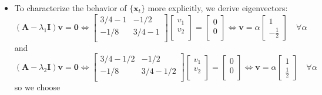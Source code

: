 \documentclass[12pt,a4paper]{article}
\begin{document}
\begin{itemize}
\begin{itemize}
  \item To characterize the behavior of $\{\bm{x}_{t}\}$ more explicitly,
    we derive eigenvectors:
    \begin{equation}\nonumber%
      (\bm{A}-\lambda_{1}\bm{I})\bm{v}
      = \bm{0}
      \iff
      \begin{bmatrix}
        3/4 - 1 & - 1/2 \\
        -1/8 & 3/4 - 1 \\
      \end{bmatrix}
      \begin{bmatrix}
        v_{1} \\
        v_{2} \\
      \end{bmatrix}
      =
      \begin{bmatrix}
        0 \\
        0 \\
      \end{bmatrix}
      \iff
      \bm{v} = \alpha
      \begin{bmatrix}
        1 \\
        -\frac{1}{2}
      \end{bmatrix}
      \quad \forall \alpha
    \end{equation}
    and
    \begin{equation}\nonumber%
      (\bm{A}-\lambda_{2}\bm{I})\bm{v}
      = \bm{0}
      \iff
      \begin{bmatrix}
        3/4 - 1/2 & - 1/2 \\
        -1/8 & 3/4 - 1/2 \\
      \end{bmatrix}
      \begin{bmatrix}
        v_{1} \\
        v_{2} \\
      \end{bmatrix}
      =
      \begin{bmatrix}
        0 \\
        0 \\
      \end{bmatrix}
      \iff
      \bm{v} = \alpha
      \begin{bmatrix}
        1 \\
        \frac{1}{2}
      \end{bmatrix}
      \quad \forall \alpha
    \end{equation}
    so we choose
    \begin{equation}\nonumber%

\end{equation}
\end{itemize}
\end{itemize}
\end{document}
